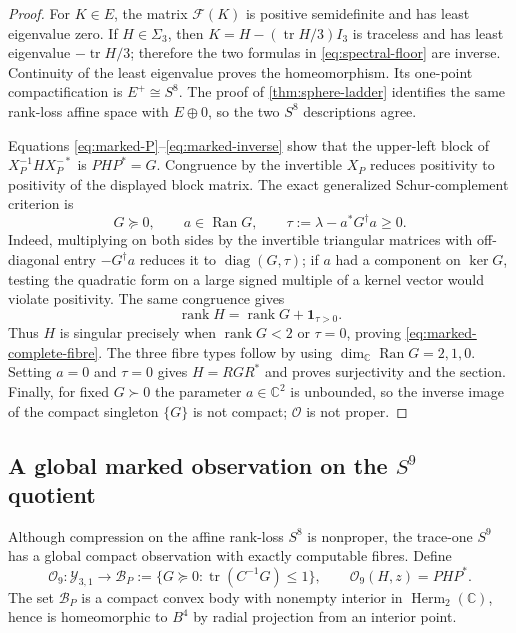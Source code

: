 \documentclass[11pt]{article}
\theoremstyle{definition}
\newcommand{\C}{\mathbb C}
\newcommand{\Herm}{\operatorname{Herm}}
\newcommand{\tr}{\operatorname{tr}}
\newcommand{\rank}{\operatorname{rank}}
\newcommand{\diag}{\operatorname{diag}}
\newcommand{\one}{\mathbf 1}
\begin{document}
\begin{proof}
For $K\in E$, the matrix $\mathcal F(K)$ is positive semidefinite and has
least eigenvalue zero.  If $H\in\Sigma_3$, then
$K=H-(\tr H/3)I_3$ is traceless and has least eigenvalue $-\tr H/3$;
therefore the two formulas in \eqref{eq:spectral-floor} are inverse.
Continuity of the least eigenvalue proves the homeomorphism.  Its one-point
compactification is $E^+\cong S^8$.  The proof of
\cref{thm:sphere-ladder} identifies the same rank-loss affine space with
$E\oplus0$, so the two $S^8$ descriptions agree.

Equations \eqref{eq:marked-P}--\eqref{eq:marked-inverse} show that the
upper-left block of $X_P^{-1}HX_P^{-*}$ is $PHP^*=G$.  Congruence by the
invertible $X_P$ reduces positivity to positivity of the displayed block
matrix.  The exact generalized Schur-complement criterion is
\[
 G\succeq0,\qquad a\in\operatorname{Ran}G,\qquad
 \tau:=\lambda-a^*G^\dagger a\ge0.
\]
Indeed, multiplying on both sides by the invertible triangular matrices
with off-diagonal entry $-G^\dagger a$ reduces it to
$\diag(G,\tau)$; if $a$ had a component on $\ker G$, testing the quadratic
form on a large signed multiple of a kernel vector would violate
positivity.  The same congruence gives
\[
 \rank H=\rank G+\one_{\tau>0}.
\]
Thus $H$ is singular precisely when $\rank G<2$ or $\tau=0$, proving
\eqref{eq:marked-complete-fibre}.  The three fibre types follow by using
$\dim_\C\operatorname{Ran}G=2,1,0$.  Setting $a=0$ and $\tau=0$ gives
$H=RGR^*$ and proves surjectivity and the section.  Finally, for fixed
$G\succ0$ the parameter $a\in\C^2$ is unbounded, so the inverse image of
the compact singleton $\{G\}$ is not compact; $\mathscr O$ is not proper.
\end{proof}

\subsection[A global marked observation on the S9 quotient]
{A global marked observation on the $S^9$ quotient}

Although compression on the affine rank-loss $S^8$ is nonproper, the
trace-one $S^9$ has a global compact observation with exactly computable
fibres.  Define
\begin{equation}
 \mathscr O_9:\mathcal Y_{3,1}\longrightarrow
 \mathcal B_P:=\{G\succeq0:\tr(C^{-1}G)\le1\},\qquad
 \mathscr O_9(H,z)=PHP^*.
 \label{eq:O9}
\end{equation}
The set $\mathcal B_P$ is a compact convex body with nonempty interior in
$\Herm_2(\C)$, hence is homeomorphic to $B^4$ by radial projection from an
interior point.
\end{document}
